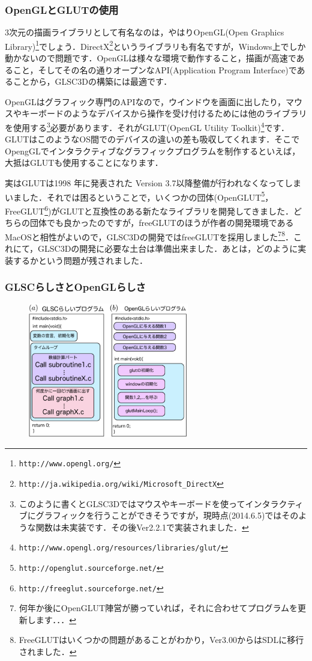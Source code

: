 \documentclass[platex,a4paper,12pt]{jsarticle}%
\begin{document}
\subsubsection{OpenGLとGLUTの使用}
3次元の描画ライブラリとして有名なのは，やはりOpenGL(Open Graphics Library)\footnote{\verb|http://www.opengl.org/|}でしょう．DirectX\footnote{\verb|http://ja.wikipedia.org/wiki/Microsoft_DirectX|}というライブラリも有名ですが，Windows上でしか動かないので問題です．OpenGLは様々な環境で動作すること，描画が高速であること，そしてその名の通りオープンなAPI(Application Program Interface)であることから，GLSC3Dの構築には最適です．

OpenGLはグラフィック専門のAPIなので，ウインドウを画面に出したり，マウスやキーボードのようなデバイスから操作を受け付けるためには他のライブラリを使用する\footnote{このように書くとGLSC3Dではマウスやキーボードを使ってインタラクティブにグラフィックを行うことができそうですが，現時点(2014.6.5)ではそのような関数は未実装です．その後Ver2.2.1で実装されました．}必要があります．それがGLUT(OpenGL Utility Toolkit)\footnote{\verb|http://www.opengl.org/resources/libraries/glut/|}です．GLUTはこのようなOS間でのデバイスの違いの差も吸収してくれます．そこでOpengGLでインタラクティブなグラフィックプログラムを制作するといえば，大抵はGLUTも使用することになります．

実はGLUTは1998 年に発表された Version 3.7以降整備が行われなくなってしまいました．それでは困るということで，いくつかの団体(OpenGLUT\footnote{\verb|http://openglut.sourceforge.net/|}，FreeGLUT\footnote{\verb|http://freeglut.sourceforge.net/|})がGLUTと互換性のある新たなライブラリを開発してきました．どちらの団体でも良かったのですが，freeGLUTのほうが作者の開発環境であるMacOSと相性がよいので，GLSC3Dの開発ではfreeGLUTを採用しました\footnote{何年か後にOpenGLUT陣営が勝っていれば，それに合わせてプログラムを更新します．．．}\footnote{FreeGLUTはいくつかの問題があることがわかり，Ver3.00からはSDLに移行されました．}．これにて，GLSC3Dの開発に必要な土台は準備出来ました．あとは，どのように実装するかという問題が残されました．

\subsubsection{GLSCらしさとOpenGLらしさ}

\begin{figure}
\vspace{-1\baselineskip}
	\includegraphics[width=70mm]{./Figures/eps/002.eps}
\end{figure}
\end{document}
